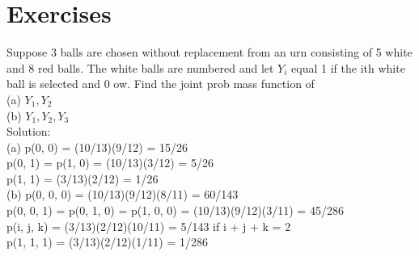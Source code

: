 \documentclass{article}
\begin{document}
\section*{Exercises}
Suppose 3 balls are chosen without replacement from an urn consisting of 5 white and 8 red balls. The white balls are numbered and let $Y_i$ equal 1 if the ith white ball is selected and 0 ow. Find the joint prob mass function of \\
(a) $Y_1, Y_2$ \\
(b) $Y_1, Y_2, Y_3$ \\
Solution: \\
(a) p(0, 0) = (10/13)(9/12) = 15/26 \\ 
p(0, 1) = p(1, 0) = (10/13)(3/12) = 5/26 \\ 
p(1, 1) = (3/13)(2/12) = 1/26 \\ 
(b) p(0, 0, 0) = (10/13)(9/12)(8/11) = 60/143 \\ 
p(0, 0, 1) = p(0, 1, 0) = p(1, 0, 0) = (10/13)(9/12)(3/11) = 45/286 \\ 
p(i, j, k) = (3/13)(2/12)(10/11) = 5/143 if i + j + k = 2 \\ 
p(1, 1, 1) = (3/13)(2/12)(1/11) = 1/286 


\end{document}
